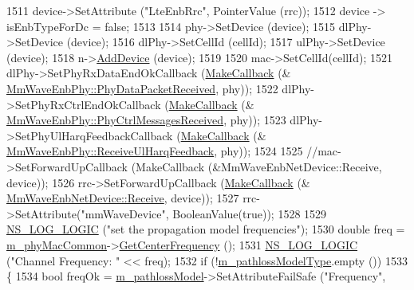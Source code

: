 \begin{DoxyCode}
1511         device->SetAttribute (\textcolor{stringliteral}{"LteEnbRrc"}, PointerValue (rrc));
1512         device -> isEnbTypeForDc = \textcolor{keyword}{false};
1513 
1514         phy->SetDevice (device);
1515         dlPhy->SetDevice (device);
1516         dlPhy->SetCellId (cellId);
1517         ulPhy->SetDevice (device);
1518         n->\hyperlink{classns3_1_1Node_a42ff83ee1d5d1649c770d3f5b62375de}{AddDevice} (device);
1519 
1520         mac->SetCellId(cellId);
1521         dlPhy->SetPhyRxDataEndOkCallback (\hyperlink{group__makecallbackmemptr_ga9376283685aa99d204048d6a4b7610a4}{MakeCallback} (&
      \hyperlink{classns3_1_1MmWaveEnbPhy_a4da2f965c88f46e2ff20d17992b001ce}{MmWaveEnbPhy::PhyDataPacketReceived}, phy));
1522         dlPhy->SetPhyRxCtrlEndOkCallback (\hyperlink{group__makecallbackmemptr_ga9376283685aa99d204048d6a4b7610a4}{MakeCallback} (&
      \hyperlink{classns3_1_1MmWaveEnbPhy_ab29ddb6f1128a28601a8cc9259fedf78}{MmWaveEnbPhy::PhyCtrlMessagesReceived}, phy));
1523         dlPhy->SetPhyUlHarqFeedbackCallback (\hyperlink{group__makecallbackmemptr_ga9376283685aa99d204048d6a4b7610a4}{MakeCallback} (&
      \hyperlink{classns3_1_1MmWaveEnbPhy_af4e7efb885e564c6a2f2b82303ef098a}{MmWaveEnbPhy::ReceiveUlHarqFeedback}, phy));
1524 
1525         \textcolor{comment}{//mac->SetForwardUpCallback (MakeCallback (&MmWaveEnbNetDevice::Receive, device));}
1526         rrc->SetForwardUpCallback (\hyperlink{group__makecallbackmemptr_ga9376283685aa99d204048d6a4b7610a4}{MakeCallback} (&
      \hyperlink{classns3_1_1MmWaveNetDevice_a89410619e5b6def2634940a9ab827d38}{MmWaveEnbNetDevice::Receive}, device));
1527         rrc->SetAttribute(\textcolor{stringliteral}{"mmWaveDevice"}, BooleanValue(\textcolor{keyword}{true}));
1528 
1529         \hyperlink{group__logging_ga88acd260151caf2db9c0fc84997f45ce}{NS\_LOG\_LOGIC} (\textcolor{stringliteral}{"set the propagation model frequencies"});
1530         \textcolor{keywordtype}{double} freq = \hyperlink{classns3_1_1MmWaveHelper_a6aaa35de743b9a88998de0128b1046b4}{m\_phyMacCommon}->\hyperlink{classns3_1_1MmWavePhyMacCommon_a0850d2e37c7075b9bce242723b722019}{GetCenterFrequency} ();
1531         \hyperlink{group__logging_ga88acd260151caf2db9c0fc84997f45ce}{NS\_LOG\_LOGIC} (\textcolor{stringliteral}{"Channel Frequency: "} << freq);
1532         \textcolor{keywordflow}{if} (!\hyperlink{classns3_1_1MmWaveHelper_a7f17e9bc4797b51d9a31d16c7e667960}{m\_pathlossModelType}.empty ())
1533         \{
1534                 \textcolor{keywordtype}{bool} freqOk = \hyperlink{classns3_1_1MmWaveHelper_a4de60027f5a256fe51033e6d6803e9b0}{m\_pathlossModel}->SetAttributeFailSafe (\textcolor{stringliteral}{"Frequency"}, 

\end{DoxyCode}

